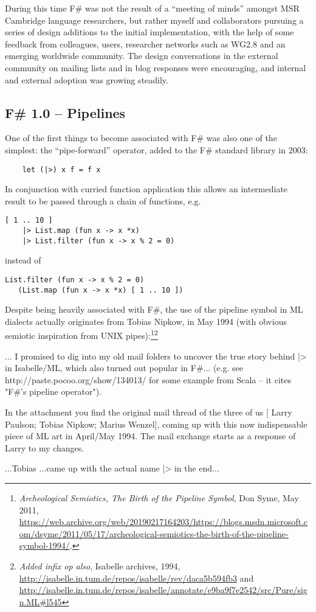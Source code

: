 \documentclass[acmsmall,review]{acmart}\settopmatter{printfolios=true,printccs=false,printacmref=false}
\begin{document}
During this time F\# was not the result of a “meeting of minds” amongst MSR Cambridge language researchers, but rather myself and collaborators pursuing a series of design additions to the initial implementation, with the help of some feedback from colleagues, users, researcher networks such as WG2.8 and an emerging worldwide community.  The design conversations in the external community on mailing lists and in blog responses were encouraging, and internal and external adoption was growing steadily. 
\subsection*{F\# 1.0 – Pipelines}

One of the first things to become associated with F\# was also one of the simplest: the “pipe-forward” operator, added to the F\# standard library in 2003:
\begin{verbatim}
    let (|>) x f = f x
\end{verbatim}
In conjunction with curried function application this allows an intermediate result to be passed through a chain of functions, e.g.
\begin{verbatim}
[ 1 .. 10 ] 
    |> List.map (fun x -> x *x) 
    |> List.filter (fun x -> x % 2 = 0)
\end{verbatim}
instead of 
\begin{verbatim}
List.filter (fun x -> x % 2 = 0) 
   (List.map (fun x -> x *x) [ 1 .. 10 ])
\end{verbatim}
Despite being heavily associated with F\#, the use of the pipeline symbol in ML dialects actually originates from Tobias Nipkow, in May 1994 (with obvious semiotic inspiration from UNIX pipes):\footnote{\textit{Archeological Semiotics, The Birth of the Pipeline Symbol}, Don Syme, May 2011, \url{https://web.archive.org/web/20190217164203/https://blogs.msdn.microsoft.com/dsyme/2011/05/17/archeological-semiotics-the-birth-of-the-pipeline-symbol-1994/}.}\footnote{\textit{Added infix op also}, Isabelle archives, 1994, \url{http://isabelle.in.tum.de/repos/isabelle/rev/daca5b594fb3} and \url{http://isabelle.in.tum.de/repos/isabelle/annotate/e9ba9f7e2542/src/Pure/sign.ML\#l545}}
\begin{verbquote}
... I promised to dig into my old mail folders to uncover the true story behind |> in Isabelle/ML, which also turned out popular in F\#... (e.g. see http://paste.pocoo.org/show/134013/ for some example from Scala -- it cites "F\#'s pipeline operator"). 

In the attachment you find the original mail thread of the three of us [ Larry Paulson; Tobias Nipkow; Marius Wenzel], coming up with this now indispensable piece of ML art in April/May 1994. The mail exchange starts as a response of Larry to my changes.  

...Tobias ...came up with the actual name |> in the end...
\end{verbquote}
\end{document}
